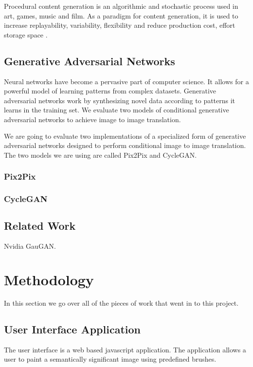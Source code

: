 \documentclass[twocolumn]{article}
\begin{document}
	Procedural content generation is an algorithmic and stochastic process used in art, games, music and film. As a paradigm for content generation, it is used to increase replayability, variability, flexibility and reduce production cost, effort storage space \cite{summerville2017procedural}.

	\subsection{Generative Adversarial Networks}
	
	Neural networks have become a pervasive part of computer science. It allows for a powerful model of learning patterns from complex datasets. Generative adversarial networks work by synthesizing novel data according to patterns it learns in the training set. We evaluate two models of conditional generative adversarial networks to achieve image to image translation.
	
	We are going to evaluate two implementations of a specialized form of generative adversarial networks designed to perform conditional image to image translation. The two models we are using are called Pix2Pix and CycleGAN.
	
	\subsubsection{Pix2Pix}
	
	\subsubsection{CycleGAN}

	\subsection{Related Work}

	Nvidia GauGAN. 	
	
	\section{Methodology}
	
	In this section we go over all of the pieces of work that went in to this project.
	
	\subsection{User Interface Application}
	
	The user interface is a web based javascript application. The application allows a user to paint a semantically significant image using predefined brushes.
	
\end{document}
